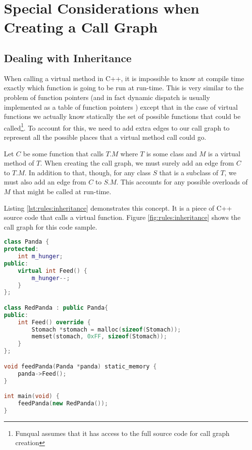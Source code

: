 \section{Special Considerations when Creating a Call Graph}\label{sec:rules:special}

\subsection{Dealing with Inheritance}\label{sec:rules:inherit}

When calling a virtual method in C++, it is impossible to know at compile time exactly which function is going to be run at run-time.  This is very similar to the problem of function pointers (and in fact dynamic dispatch is usually implemented as a table of function pointers \cite{language-standard}) except that in the case of virtual functions we actually know statically the set of possible functions that could be called\footnote{Funqual assumes that it has access to the full source code for call graph creation}.  To account for this, we need to add extra edges to our call graph to represent all the possible places that a virtual method call could go.  

Let $C$ be some function that calls $T.M$ where $T$ is some class and $M$ is a virtual method of $T$.  When creating the call graph, we must surely add an edge from $C$ to $T.M$.  In addition to that, though, for any class $S$ that is a subclass of $T$, we must also add an edge from $C$ to $S.M$.  This accounts for any possible overloads of $M$ that might be called at run-time.

Listing \ref{lst:rules:inheritance} demonstrates this concept.  It is a piece of C++ source code that calls a virtual function.  Figure \ref{fig:rules:inheritance} shows the call graph for this code sample.  

\noindent\begin{minipage}[t]{\linewidth}
\begin{lstlisting}[language=C++,caption={Example C++ program demonstrating inheritance.  In \lstinline{feedPanda}, it is impossible to know statically which instance of the \lstinline{Feed} function will be called.  Figure \ref{fig:rules:inheritance} shows the call graph for this program.},label={lst:rules:inheritance}]
class Panda {
protected:
    int m_hunger;
public:
    virtual int Feed() {
        m_hunger--;
    }
};

class RedPanda : public Panda{
public:
    int Feed() override {
        Stomach *stomach = malloc(sizeof(Stomach));
        memset(stomach, 0xFF, sizeof(Stomach));
    }
};

void feedPanda(Panda *panda) static_memory {
    panda->Feed();
}

int main(void) {
    feedPanda(new RedPanda());
}
\end{lstlisting}
\end{minipage}

